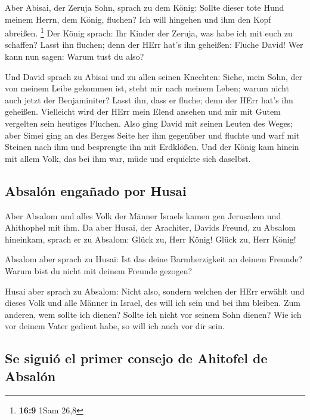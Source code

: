  Aber Abisai, der Zeruja Sohn, sprach zu dem König: Sollte
dieser tote Hund meinem Herrn, dem König, fluchen? Ich will hingehen und
ihm den Kopf abreißen. \footnote{\textbf{16:9} 1Sam 26,8}
 Der König sprach: Ihr Kinder der Zeruja, was habe ich
mit euch zu schaffen? Lasst ihn fluchen; denn der HErr hat's ihn
geheißen: Fluche David! Wer kann nun sagen: Warum tust du also?

 Und David sprach zu Abisai und zu allen seinen Knechten:
Siehe, mein Sohn, der von meinem Leibe gekommen ist, steht mir nach
meinem Leben; warum nicht auch jetzt der Benjaminiter? Lasst ihn, dass
er fluche; denn der HErr hat's ihn geheißen.  Vielleicht
wird der HErr mein Elend ansehen und mir mit Gutem vergelten sein
heutiges Fluchen.  Also ging David mit seinen Leuten des
Weges; aber Simei ging an des Berges Seite her ihm gegenüber und fluchte
und warf mit Steinen nach ihm und besprengte ihn mit Erdklößen.
 Und der König kam hinein mit allem Volk, das bei ihm
war, müde und erquickte sich daselbst.

\hypertarget{absaluxf3n-engauxf1ado-por-husai}{%
\subsection{Absalón engañado por
Husai}\label{absaluxf3n-engauxf1ado-por-husai}}

 Aber Absalom und alles Volk der Männer Israels kamen gen
Jerusalem und Ahithophel mit ihm.  Da aber Husai, der
Arachiter, Davids Freund, zu Absalom hineinkam, sprach er zu Absalom:
Glück zu, Herr König! Glück zu, Herr König!

 Absalom aber sprach zu Husai: Ist das deine
Barmherzigkeit an deinem Freunde? Warum bist du nicht mit deinem Freunde
gezogen?

 Husai aber sprach zu Absalom: Nicht also, sondern
welchen der HErr erwählt und dieses Volk und alle Männer in Israel, des
will ich sein und bei ihm bleiben.  Zum anderen, wem
sollte ich dienen? Sollte ich nicht vor seinem Sohn dienen? Wie ich vor
deinem Vater gedient habe, so will ich auch vor dir sein.

\hypertarget{se-siguiuxf3-el-primer-consejo-de-ahitofel-de-absaluxf3n}{%
\subsection{Se siguió el primer consejo de Ahitofel de
Absalón}\label{se-siguiuxf3-el-primer-consejo-de-ahitofel-de-absaluxf3n}}

